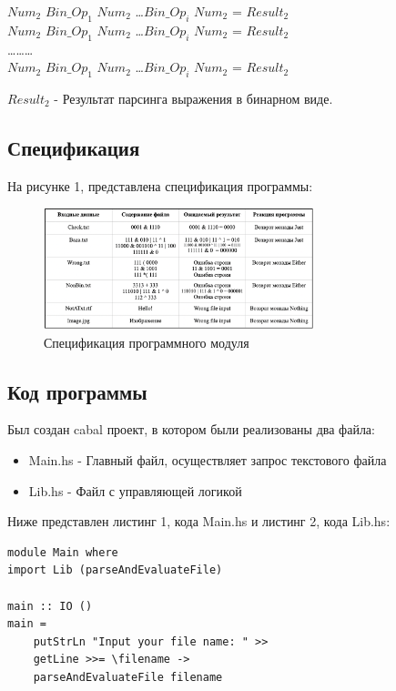 \documentclass[areasetadvanced]{scrartcl}
\begin{document}
\begin{center}
    $Num_2$ \space $Bin\_Op_1$ \space  $Num_2$ \space \dots \space $Bin\_Op_i$ \space $Num_2$ \space = $Result_2$\\
    $Num_2$ \space $Bin\_Op_1$ \space  $Num_2$ \space \dots \space $Bin\_Op_i$ \space $Num_2$ \space = $Result_2$\\
    \dots \space \space \dots \space \space \dots\\
    $Num_2$ \space $Bin\_Op_1$ \space  $Num_2$ \space \dots \space $Bin\_Op_i$ \space $Num_2$ \space = $Result_2$\\
\end{center}
$Result_2$ - Результат парсинга выражения в бинарном виде.
\subsection{Спецификация}
На рисунке 1, представлена спецификация программы:
\begin{figure}[H]
    \centering
    \includegraphics[width=0.7\textwidth]{Spec.png}
    \caption{Спецификация программного модуля}
    \label{fig:syntdiag}
\end{figure}
\newpage
\subsection{Код программы}
Был создан cabal проект, в котором были реализованы два файла:
\begin{itemize}
    \item Main.hs - Главный файл, осуществляет запрос текстового файла
    \item Lib.hs - Файл с управляющей логикой
\end{itemize}
Ниже представлен листинг 1, кода Main.hs и листинг 2, кода Lib.hs:
\begin{lstlisting}[caption={Main.hs}, label=lst:main]
module Main where
import Lib (parseAndEvaluateFile)

main :: IO ()
main = 
    putStrLn "Input your file name: " >>
    getLine >>= \filename ->
    parseAndEvaluateFile filename
\end{lstlisting}
\end{document}
